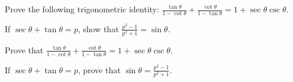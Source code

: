 \documentclass[12pt,a4paper]{exam}
\begin{document}
\begin{questions}
\question[5] Prove the following trigonometric identity: $\frac{\tan \theta}{1 - \cot \theta} + \frac{\cot \theta}{1 - \tan \theta} = 1 + \sec \theta \csc \theta$.
\vspace{0.15cm}

\question[5] If $\sec \theta + \tan \theta = p$, show that $\frac{p^2 - 1}{p^2 + 1} = \sin \theta$.
\vspace{0.15cm}

\question[5] Prove that $\frac{\tan \theta}{1 - \cot \theta} + \frac{\cot \theta}{1 - \tan \theta} = 1 + \sec \theta \csc \theta$.
\vspace{0.15cm}

\question[5] If $\sec \theta + \tan \theta = p$, prove that $\sin \theta = \frac{p^2 - 1}{p^2 + 1}$.
\vspace{0.15cm}

\end{questions}
\bigskip
\end{document}
